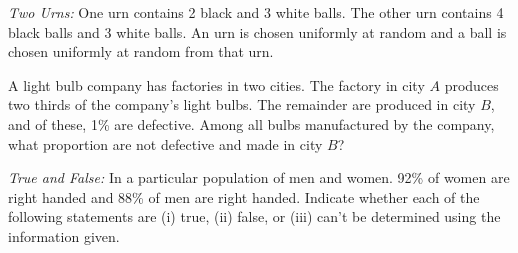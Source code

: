\documentclass[addpoints,12pt]{exam}
\begin{document}
\begin{questions}
\vspace{1.2in}

\question[3]
\emph{Two Urns:} One urn contains 2 black and 3 white balls. The other urn contains 4 black balls and 3 white balls. An urn is chosen uniformly at random and a ball is chosen uniformly at random from that urn.
\noaddpoints
{}
\addpoints

\question[2] A light bulb company has factories in two cities. The factory in city $A$ produces two thirds of the company's light bulbs. The remainder are produced in city $B$, and of these, 1\% are defective. Among all bulbs manufactured by the company, what proportion are not defective and made in city $B$?

\vspace{2in}
\newpage

\question[4]
\emph{True and False:} In a particular population of men and women. 92\% of women are right handed and 88\% of men are right handed. Indicate whether each of the following statements are (i) true, (ii) false, or (iii) can't be determined using the information given.
\noaddpoints
{}
\end{questions}
\end{document}
